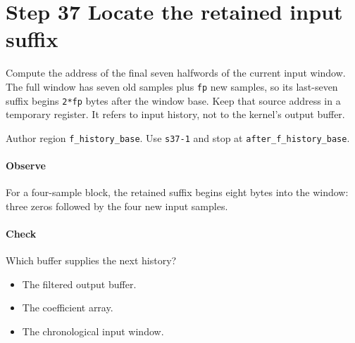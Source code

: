 \section{Step 37 Locate the retained input suffix}\label{pcm-wav-s37}
Compute the address of the final seven halfwords of the current input window. The full window has seven old samples plus \texttt{fp} new samples, so its last-seven suffix begins \texttt{2*fp} bytes after the window base. Keep that source address in a temporary register. It refers to input history, not to the kernel's output buffer.

Author region \texttt{f\_history\_base}. Use \texttt{s37-1} and stop at \texttt{after\_f\_history\_base}.

\paragraph{Observe} For a four-sample block, the retained suffix begins eight bytes into the window: three zeros followed by the four new input samples.

\paragraph{Check} Which buffer supplies the next history?
\begin{itemize}
\item[A.] The filtered output buffer.
\item[B.] The coefficient array.
\item[C.] The chronological input window.
\end{itemize}
